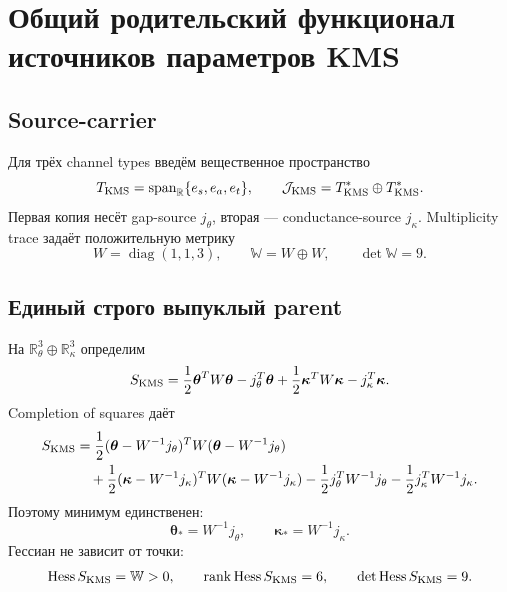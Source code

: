 \chapter{Общий родительский функционал источников параметров KMS}
\label{ch:v9-endpoint-kms-source-parent}

\section{Source-carrier}

Для трёх channel types введём вещественное пространство
\begin{equation}
 T_{\rm KMS}=\operatorname{span}_{\mathbb R}\{e_s,e_a,e_t\},
 \qquad
 \mathcal J_{\rm KMS}=T_{\rm KMS}^*\oplus T_{\rm KMS}^*.
 \label{eq:v9-kms-source-parent-carrier}
\end{equation}
Первая копия несёт gap-source $j_\theta$, вторая --- conductance-source
$j_\kappa$. Multiplicity trace задаёт положительную метрику
\begin{equation}
 W=\operatorname{diag}(1,1,3),
 \qquad
 \mathbb W=W\oplus W,
 \qquad
 \det\mathbb W=9.
 \label{eq:v9-kms-source-parent-metric}
\end{equation}

\section{Единый строго выпуклый parent}

На $\mathbb R^3_\theta\oplus\mathbb R^3_\kappa$ определим
\begin{equation}
 S_{\rm KMS}=
 \frac12\boldsymbol\theta^TW\boldsymbol\theta-j_\theta^T\boldsymbol\theta
 +\frac12\boldsymbol\kappa^TW\boldsymbol\kappa-j_\kappa^T\boldsymbol\kappa.
 \label{eq:v9-kms-source-parent-functional}
\end{equation}
Completion of squares даёт
\begin{equation}
 \begin{aligned}
 S_{\rm KMS}
 &=\frac12(\boldsymbol\theta-W^{-1}j_\theta)^T
 W(\boldsymbol\theta-W^{-1}j_\theta)\\
 &\quad+\frac12(\boldsymbol\kappa-W^{-1}j_\kappa)^T
 W(\boldsymbol\kappa-W^{-1}j_\kappa)
 -\frac12j_\theta^TW^{-1}j_\theta
 -\frac12j_\kappa^TW^{-1}j_\kappa .
 \end{aligned}
 \label{eq:v9-kms-source-parent-completion}
\end{equation}
Поэтому минимум единственен:
\begin{equation}
 \boldsymbol\theta_*=W^{-1}j_\theta,
 \qquad
 \boldsymbol\kappa_*=W^{-1}j_\kappa.
 \label{eq:v9-kms-source-parent-minimum}
\end{equation}
Гессиан не зависит от точки:
\begin{equation}
 \operatorname{Hess} S_{\rm KMS}=\mathbb W>0,
 \qquad
 \operatorname{rank}\operatorname{Hess} S_{\rm KMS}=6,
 \qquad
 \det\operatorname{Hess} S_{\rm KMS}=9.
 \label{eq:v9-kms-source-parent-hessian}
\end{equation}

